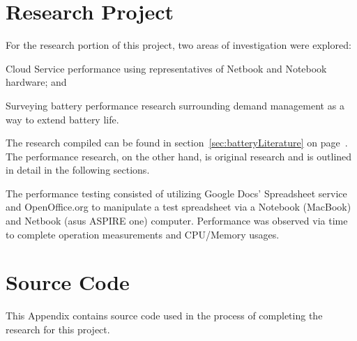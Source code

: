 \documentclass[12pt,oneside,letterpaper,titlepage]{report}
\begin{document}
  

\chapter{Research Project}

For the research portion of this project, two areas of investigation were explored:
\begin{inparaenum}[(1)]
\item Cloud Service performance using representatives of Netbook and Notebook
  hardware; and
\item Surveying battery performance research surrounding demand management as
  a way to extend battery life.
\end{inparaenum}
The research compiled can be found in section~\ref{sec:batteryLiterature} on
page~\pageref{sec:batteryLiterature}.  The performance research, on the other
hand, is original research and is outlined in detail in the following sections.

The performance testing consisted of utilizing Google Docs' Spreadsheet service
and OpenOffice.org to manipulate a test spreadsheet via a Notebook (MacBook) and
Netbook (asus ASPIRE one) computer.  Performance was observed via time to
complete operation measurements and CPU/Memory usages.

  

  

  

  

\appendix

\chapter{Source Code}

This Appendix contains source code used in the process of completing the
research for this project.

\newpage

\label{sourceCode}



\newpage


\end{document}

